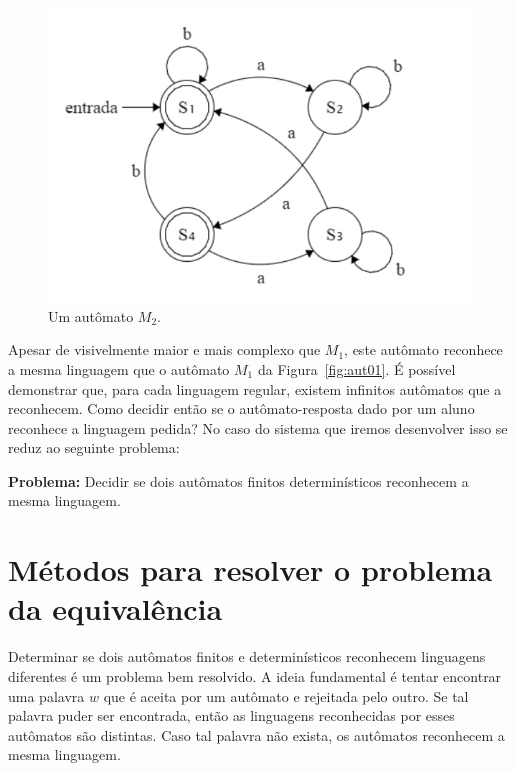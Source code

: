 \documentclass[
	12pt,				%
	openany,
	oneside,
	a4paper,			%
	english,			%
	brazil				%
	]{abntex2}
\begin{document}
  \begin{figure}[H]
    \vspace{-0.5cm}
    \centering
    \includegraphics[scale=.65]{aut02.png}
    \vspace{-0.5cm}
    \caption{Um autômato $M_2$.}
    \label{fig:aut02}
    \vspace{-0.5cm}
  \end{figure}

  Apesar de visivelmente maior e mais complexo que $M_1$, este autômato reconhece a mesma linguagem que o autômato $M_1$ da Figura~\ref{fig:aut01}. É possível demonstrar que, para cada linguagem regular, existem infinitos autômatos que a reconhecem. Como decidir então se o autômato-resposta dado por um aluno reconhece a linguagem pedida? No caso do sistema que iremos desenvolver isso se reduz ao seguinte problema:
  \bigskip



  \noindent \textbf{Problema:} Decidir se dois autômatos finitos determinísticos reconhecem a mesma linguagem.

\clearpage
\chapter[Métodos para resolver o problema da equivalência]{Métodos para resolver o problema da equivalência}

  Determinar se dois autômatos finitos e determinísticos reconhecem linguagens diferentes é um problema bem resolvido. A ideia fundamental é tentar encontrar uma palavra $w$ que é aceita por um autômato e rejeitada pelo outro. Se tal palavra puder ser encontrada, então as linguagens reconhecidas por esses autômatos são distintas. Caso tal palavra não exista, os autômatos reconhecem a mesma linguagem.
\end{document}
